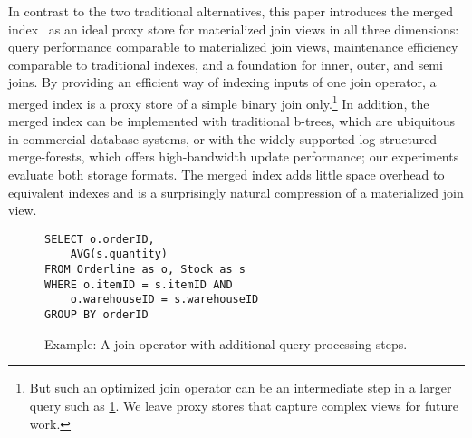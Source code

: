 \documentclass[biblatex, english]{lni}
\DeclareMathOperator{\JOIN}{\bowtie}
\begin{document}
In contrast to the two traditional alternatives,
this paper introduces the merged index~\cite{graefe2007merged} as an ideal proxy store for materialized join views in all three dimensions: query performance comparable to materialized join views, maintenance efficiency comparable to traditional indexes, and a foundation for inner, outer, and semi joins.
By providing an efficient way of indexing inputs of one join operator, a merged index is a proxy store of a simple binary join only.\footnote{
    But such an optimized join operator can be an intermediate step in a larger query such as \cref{fig:join-operator}.
    We leave proxy stores that capture complex views for future work.
}
In addition, the merged index can be implemented with traditional b-trees, which are ubiquitous in commercial database systems, or with the widely supported log-structured merge-forests, which offers high-bandwidth update performance; our experiments evaluate both storage formats.
The merged index adds little space overhead to equivalent indexes and is a surprisingly natural compression of a materialized join view.

\begin{figure}[htb]
    \begin{minipage}{0.6\linewidth}
        \footnotesize
        \begin{verbatim}
SELECT o.orderID,
    AVG(s.quantity)
FROM Orderline as o, Stock as s
WHERE o.itemID = s.itemID AND
    o.warehouseID = s.warehouseID
GROUP BY orderID
        \end{verbatim}
    \end{minipage}
    \begin{minipage}{0.38\linewidth}
    \end{minipage}
    \caption{Example: A join operator with additional query processing steps.}\label{fig:join-operator}
\end{figure}
\end{document}
